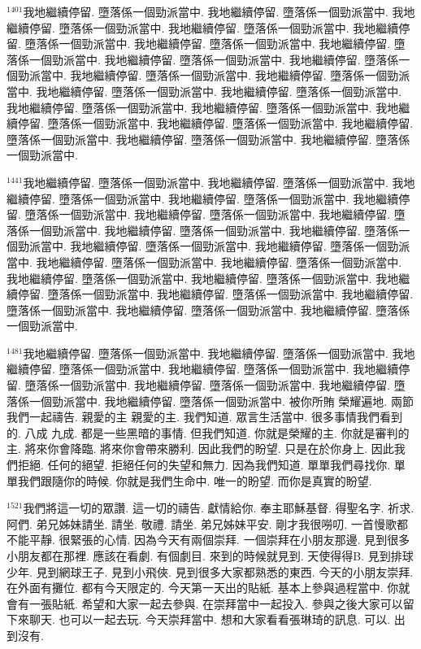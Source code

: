 \documentclass{book}
\begin{document}
$^{1401}$我地繼續停留.
墮落係一個勁派當中.
我地繼續停留.
墮落係一個勁派當中.
我地繼續停留.
墮落係一個勁派當中.
我地繼續停留.
墮落係一個勁派當中.
我地繼續停留.
墮落係一個勁派當中.
我地繼續停留.
墮落係一個勁派當中.
我地繼續停留.
墮落係一個勁派當中.
我地繼續停留.
墮落係一個勁派當中.
我地繼續停留.
墮落係一個勁派當中.
我地繼續停留.
墮落係一個勁派當中.
我地繼續停留.
墮落係一個勁派當中.
我地繼續停留.
墮落係一個勁派當中.
我地繼續停留.
墮落係一個勁派當中.
我地繼續停留.
墮落係一個勁派當中.
我地繼續停留.
墮落係一個勁派當中.
我地繼續停留.
墮落係一個勁派當中.
我地繼續停留.
墮落係一個勁派當中.
我地繼續停留.
墮落係一個勁派當中.
我地繼續停留.
墮落係一個勁派當中.
我地繼續停留.
墮落係一個勁派當中.

$^{1441}$我地繼續停留.
墮落係一個勁派當中.
我地繼續停留.
墮落係一個勁派當中.
我地繼續停留.
墮落係一個勁派當中.
我地繼續停留.
墮落係一個勁派當中.
我地繼續停留.
墮落係一個勁派當中.
我地繼續停留.
墮落係一個勁派當中.
我地繼續停留.
墮落係一個勁派當中.
我地繼續停留.
墮落係一個勁派當中.
我地繼續停留.
墮落係一個勁派當中.
我地繼續停留.
墮落係一個勁派當中.
我地繼續停留.
墮落係一個勁派當中.
我地繼續停留.
墮落係一個勁派當中.
我地繼續停留.
墮落係一個勁派當中.
我地繼續停留.
墮落係一個勁派當中.
我地繼續停留.
墮落係一個勁派當中.
我地繼續停留.
墮落係一個勁派當中.
我地繼續停留.
墮落係一個勁派當中.
我地繼續停留.
墮落係一個勁派當中.
我地繼續停留.
墮落係一個勁派當中.
我地繼續停留.
墮落係一個勁派當中.

$^{1481}$我地繼續停留.
墮落係一個勁派當中.
我地繼續停留.
墮落係一個勁派當中.
我地繼續停留.
墮落係一個勁派當中.
我地繼續停留.
墮落係一個勁派當中.
我地繼續停留.
墮落係一個勁派當中.
我地繼續停留.
墮落係一個勁派當中.
我地繼續停留.
墮落係一個勁派當中.
我地繼續停留.
墮落係一個勁派當中.
被你所賄 榮耀遍地.
兩節我們一起禱告.
親愛的主 親愛的主.
我們知道.
眾言生活當中.
很多事情我們看到的.
八成 九成.
都是一些黑暗的事情.
但我們知道.
你就是榮耀的主.
你就是審判的主.
將來你會降臨.
將來你會帶來勝利.
因此我們的盼望.
只是在於你身上.
因此我們拒絕.
任何的絕望.
拒絕任何的失望和無力.
因為我們知道.
單單我們尋找你.
單單我們跟隨你的時候.
你就是我們生命中.
唯一的盼望.
而你是真實的盼望.

$^{1521}$我們將這一切的眾讚.
這一切的禱告.
獻情給你.
奉主耶穌基督.
得聖名字.
祈求.
阿們.
弟兄姊妹請坐.
請坐.
敬禮.
請坐.
弟兄姊妹平安.
剛才我很嘮叨.
一首慢歌都不能平靜.
很緊張的心情.
因為今天有兩個崇拜.
一個崇拜在小朋友那邊.
見到很多小朋友都在那裡.
應該在看劇.
有個劇目.
來到的時候就見到.
天使得得B.
見到排球少年.
見到網球王子.
見到小飛俠.
見到很多大家都熟悉的東西.
今天的小朋友崇拜.
在外面有攤位.
都有今天限定的.
今天第一天出的貼紙.
基本上參與過程當中.
你就會有一張貼紙.
希望和大家一起去參與.
在崇拜當中一起投入.
參與之後大家可以留下來聊天.
也可以一起去玩.
今天崇拜當中.
想和大家看看張琳琦的訊息.
可以.
出到沒有.
\end{document}
